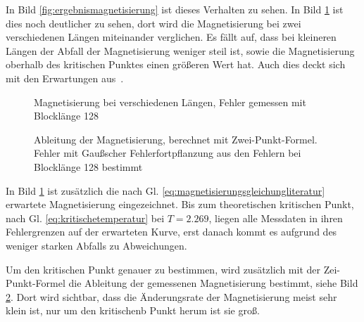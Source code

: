 
	In Bild \ref{fig:ergebnismagnetisierung} ist dieses Verhalten zu sehen. In Bild \ref{fig:maglaenge} ist dies noch deutlicher zu sehen, dort wird die Magnetisierung bei zwei verschiedenen Längen miteinander verglichen. Es fällt auf, dass bei kleineren Längen der Abfall der Magnetisierung weniger steil ist, sowie die Magnetisierung oberhalb des kritischen Punktes einen größeren Wert hat. Auch dies deckt sich mit den Erwartungen aus~\cite[Abschnitt 2.3.3]{binderheermann}.%

	
	
	\begin{figure}[htbp]
		
		\caption[Magnetisierung bei verschiedenen Längen]{Magnetisierung bei verschiedenen Längen, Fehler gemessen mit Blocklänge 128}
		\label{fig:maglaenge}
	\end{figure}

	\begin{figure}[htbp]
		
		\caption[Ableitung der Magnetisierung]{Ableitung der Magnetisierung, berechnet mit Zwei-Punkt-Formel. Fehler mit Gaußscher Fehlerfortpflanzung aus den Fehlern bei Blocklänge 128 bestimmt}
		\label{fig:ableitung120128}
	\end{figure}
	
	In Bild \ref{fig:maglaenge} ist zusätzlich die nach Gl. \ref{eq:magnetisierungsgleichungliteratur} erwartete Magnetisierung eingezeichnet. Bis zum theoretischen kritischen Punkt, nach Gl. \ref{eq:kritischetemperatur} bei $T=\num{2,269}$, liegen alle Messdaten in ihren Fehlergrenzen auf der erwarteten Kurve, erst danach kommt es aufgrund des weniger starken Abfalls zu Abweichungen.
	
	Um den kritischen Punkt genauer zu bestimmen, wird zusätzlich mit der Zei-Punkt-Formel die Ableitung der gemessenen Magnetisierung bestimmt, siehe Bild \ref{fig:ableitung120128}. Dort wird sichtbar, dass die Änderungsrate der Magnetisierung meist sehr klein ist, nur um den kritischenb Punkt herum ist sie groß.%
	
%		
%	
